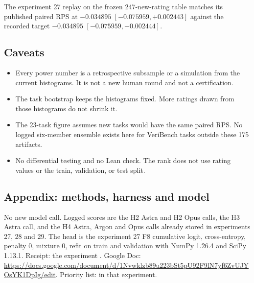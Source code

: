 The experiment 27 replay on the frozen 247-new-rating table matches its published paired RPS at $-0.034895$ $[-0.075959,+0.002443]$ against the recorded target $-0.034895$ $[-0.075959,+0.002444]$.

\subsection*{Caveats}
\begin{itemize}
  \item Every power number is a retrospective subsample or a simulation from the current histograms. It is not a new human round and not a certification.
  \item The task bootstrap keeps the histograms fixed. More ratings drawn from those histograms do not shrink it.
  \item The 23-task figure assumes new tasks would have the same paired RPS. No logged six-member ensemble exists here for VeriBench tasks outside these 175 artifacts.
  \item No differential testing and no Lean check. The rank does not use rating values or the train, validation, or test split.
\end{itemize}

\subsection*{Appendix: methods, harness and model}
No new model call.
Logged scores are the H2 Astra and H2 Opus calls, the H3 Astra call, and the H4 Astra, Argon and Opus calls already stored in experiments 27, 28 and 29.
The head is the experiment 27 F8 cumulative logit, cross-entropy, penalty 0, mixture 0, refit on train and validation with NumPy 1.26.4 and SciPy 1.13.1.
Receipt: the experiment .
Google Doc: \url{https://docs.google.com/document/d/1Nvwklzb89u223bSt5pU92F9lN7yf6ZvUJYOsYK1DpIg/edit}.
Priority list:  in that experiment.
